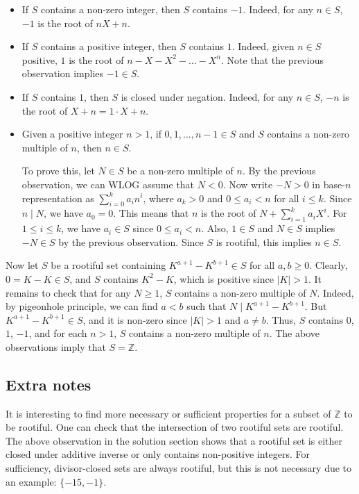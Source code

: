 \documentclass{article}
\newcommand{\Z}{\mathbb{Z}}
\begin{document}
\begin{itemize}

    \item
    If $S$ contains a non-zero integer, then $S$ contains $-1$.
    Indeed, for any $n \in S$, $-1$ is the root of $nX + n$.

    \item
    If $S$ contains a positive integer, then $S$ contains $1$.
    Indeed, given $n \in S$ positive, $1$ is the root of $n - X - X^2 - \ldots - X^n$.
    Note that the previous observation implies $-1 \in S$.

    \item
    If $S$ contains $1$, then $S$ is closed under negation.
    Indeed, for any $n \in S$, $-n$ is the root of $X + n = 1 \cdot X + n$.

    \item
    Given a positive integer $n > 1$, if $0, 1, \ldots, n - 1 \in S$ and $S$ contains a non-zero multiple of $n$, then $n \in S$.

    To prove this, let $N \in S$ be a non-zero multiple of $n$.
    By the previous observation, we can WLOG assume that $N < 0$.
    Now write $-N > 0$ in base-$n$ representation as $\sum_{i = 0}^k a_i n^i$, where $a_k > 0$ and $0 \leq a_i < n$ for all $i \leq k$.
    Since $n \mid N$, we have $a_0 = 0$.
    This means that $n$ is the root of $N + \sum_{i = 1}^k a_i X^i$.
    For $1 \leq i \leq k$, we have $a_i \in S$ since $0 \leq a_i < n$.
    Also, $1 \in S$ and $N \in S$ implies $-N \in S$ by the previous observation.
    Since $S$ is rootiful, this implies $n \in S$.

\end{itemize}

Now let $S$ be a rootiful set containing $K^{a + 1} - K^{b + 1} \in S$ for all $a, b \geq 0$.
Clearly, $0 = K - K \in S$, and $S$ contains $K^2 - K$, which is positive since $|K| > 1$.
It remains to check that for any $N \geq 1$, $S$ contains a non-zero multiple of $N$.
Indeed, by pigeonhole principle, we can find $a < b$ such that $N \mid K^{a + 1} - K^{b + 1}$.
But $K^{a + 1} - K^{b + 1} \in S$, and it is non-zero since $|K| > 1$ and $a \neq b$.
Thus, $S$ contains $0$, $1$, $-1$, and for each $n > 1$, $S$ contains a non-zero multiple of $n$.
The above observations imply that $S = \Z$.



\subsection*{Extra notes}

It is interesting to find more necessary or sufficient properties for a subset of $\Z$ to be rootiful.
One can check that the intersection of two rootiful sets are rootiful.
The above observation in the solution section shows that a rootiful set is either closed under additive inverse or only contains non-positive integers.
For sufficiency, divisor-closed sets are always rootiful, but this is not necessary due to an example: $\{-15, -1\}$.
\end{document}
